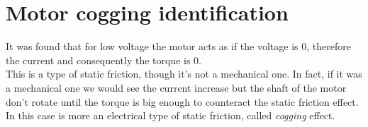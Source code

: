     
    \begin{figure}[!tbh]
  \centering
  \hfill
  \caption{}
     \label{fig:nlg2}
\end{figure}
\section{Motor cogging identification}
It was found that for low voltage the motor acts as if the voltage is $0$, therefore the current and consequently the torque is $0$.\\
This is  a type of static friction, though it's not a mechanical one. In fact, if it was a mechanical one we would see the current increase but the shaft of the motor don't rotate until the torque is big enough to counteract the static friction effect. In this case is more an electrical type of static friction, called \emph{cogging} effect. \\ \\

